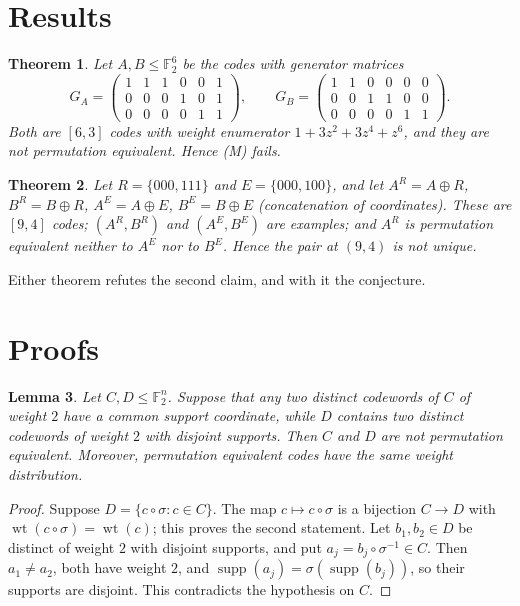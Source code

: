 \documentclass[11pt]{article}
\theoremstyle{plain}
\newtheorem{theorem}{Theorem}
\newtheorem{lemma}[theorem]{Lemma}
\theoremstyle{definition}
\theoremstyle{remark}
\newcommand{\F}{\mathbb F}
\newcommand{\wt}{\operatorname{wt}}
\newcommand{\supp}{\operatorname{supp}}
\begin{document}
\section{Results}

\begin{theorem}\label{thm:six}
Let $A,B\le\F_2^6$ be the codes with generator matrices
\[
G_A=\begin{pmatrix}1&1&1&0&0&1\\0&0&0&1&0&1\\0&0&0&0&1&1\end{pmatrix},
\qquad
G_B=\begin{pmatrix}1&1&0&0&0&0\\0&0&1&1&0&0\\0&0&0&0&1&1\end{pmatrix}.
\]
Both are $[6,3]$ codes with weight enumerator $1+3z^2+3z^4+z^6$, and they are not
permutation equivalent. Hence (M) fails.
\end{theorem}

\begin{theorem}\label{thm:nine}
Let $R=\{000,111\}$ and $E=\{000,100\}$, and let $A^R=A\oplus R$, $B^R=B\oplus R$,
$A^E=A\oplus E$, $B^E=B\oplus E$ (concatenation of coordinates). These are $[9,4]$
codes; $(A^R,B^R)$ and $(A^E,B^E)$ are examples; and $A^R$ is permutation equivalent
neither to $A^E$ nor to $B^E$. Hence the pair at $(9,4)$ is not unique.
\end{theorem}

Either theorem refutes the second claim, and with it the conjecture.

\section{Proofs}

\begin{lemma}\label{lem:inv}
Let $C,D\le\F_2^n$. Suppose that any two distinct codewords of $C$ of weight $2$
have a common support coordinate, while $D$ contains two distinct codewords of
weight $2$ with disjoint supports. Then $C$ and $D$ are not permutation equivalent.
Moreover, permutation equivalent codes have the same weight distribution.
\end{lemma}

\begin{proof}
Suppose $D=\{c\circ\sigma:c\in C\}$. The map $c\mapsto c\circ\sigma$ is a bijection
$C\to D$ with $\wt(c\circ\sigma)=\wt(c)$; this proves the second statement. Let
$b_1,b_2\in D$ be distinct of weight $2$ with disjoint supports, and put
$a_j=b_j\circ\sigma^{-1}\in C$. Then $a_1\ne a_2$, both have weight $2$, and
$\supp(a_j)=\sigma(\supp(b_j))$, so their supports are disjoint. This contradicts
the hypothesis on $C$.
\end{proof}
\end{document}
